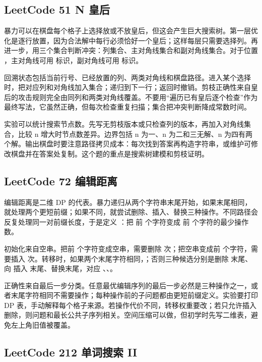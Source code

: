 \subsection{LeetCode 51 N 皇后}

暴力可以在棋盘每个格子上选择放或不放皇后，但这会产生巨大搜索树。第一层优化是逐行放置，因为合法解中每行必须恰好一个皇后；这样每层只需要选择列。再进一步，用三个集合判断冲突：列集合、主对角线集合和副对角线集合。对于位置 ，主对角线可用  标识，副对角线可用  标识。

回溯状态包括当前行号、已经放置的列、两类对角线和棋盘路径。进入某个选择时，把对应列和对角线加入集合；递归到下一行；返回时撤销。剪枝正确性来自皇后的攻击规则完全由同列和两类对角线覆盖。不要用“遍历已有皇后逐个检查”作为最终写法，它虽然正确，但每次检查重复扫描；集合把冲突判断降成常数时间。

实验可以统计搜索节点数。先写无剪枝版本或只检查列的版本，再加入对角线集合，比较 n 增大时节点数差异。边界包括 n 为一、n 为二和三无解、n 为四有两个解。输出棋盘时要注意路径拷贝成本：每次找到答案再构造字符串，或维护可修改棋盘并在答案处复制。这个题的重点是搜索树建模和剪枝证明。

\subsection{LeetCode 72 编辑距离}

编辑距离是二维 DP 的代表。暴力递归从两个字符串末尾开始，如果末尾相同，就处理两个更短前缀；如果不同，就尝试删除、插入、替换三种操作。不同路径会反复处理同一对前缀长度，于是定义 ：把  前  个字符变成  前  个字符的最少操作数。

初始化来自空串。把前  个字符变成空串，需要删除  次；把空串变成前  个字符，需要插入  次。转移时，如果两个末尾字符相同，；否则三种候选分别是删除  末尾、向  插入  末尾、替换末尾，对应 、、。

正确性来自最后一步分类。任意最优编辑序列的最后一步必然是三种操作之一，或者末尾字符相同不需要操作；每种操作前的子问题都由更短前缀定义。实验要打印 DP 表，手动解释每个格子来源。若操作代价不同，转移权重要改；若只允许插入删除，则问题和最长公共子序列相关。空间压缩可以做，但初学时先写二维表，避免左上角旧值被覆盖。

\subsection{LeetCode 212 单词搜索 II}

